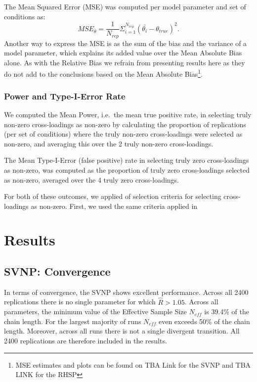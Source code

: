 \documentclass[
  man, donotrepeattitle,floatsintext]{apa6}
\begin{document}
The Mean Squared Error (MSE) was computed per model parameter and set of conditions as:
\[MSE_{\bar{\theta}} = \frac{1}{N_{rep}} \Sigma_{i = 1}^{N_{rep}} (\bar{\theta_i} - \theta_{true})^2.\]
Another way to express the MSE is as the sum of the bias and the variance of a model parameter, which explains its added value over the Mean Absolute Bias alone. As with the Relative Bias we refrain from presenting results here as they do not add to the conclusions based on the Mean Absolute Bias\footnote{MSE estimates and plots can be found on TBA Link for the SVNP and TBA LINK for the RHSP}.

\hypertarget{power-and-type-i-error-rate}{%
\subsubsection{Power and Type-I-Error Rate}\label{power-and-type-i-error-rate}}

We computed the Mean Power, i.e.~the mean true positive rate, in selecting truly non-zero cross-loadings as non-zero by calculating the proportion of replications (per set of conditions) where the truly non-zero cross-loadings were selected as non-zero, and averaging this over the 2 truly non-zero cross-loadings.

The Mean Type-I-Error (false positive) rate in selecting truly zero cross-loadings as non-zero, was computed as the proportion of truly zero cross-loadings selected as non-zero, averaged over the 4 truly zero cross-loadings.

For both of these outcomes, we applied of selection criteria for selecting cross-loadings as non-zero. First, we used the same criteria applied in

\hypertarget{results}{%
\section{Results}\label{results}}

\hypertarget{svnp-convergence}{%
\subsection{SVNP: Convergence}\label{svnp-convergence}}

In terms of convergence, the SVNP shows excellent performance. Across all 2400 replications there is no single parameter for which \(\hat{R} > 1.05\). Across all parameters, the minimum value of the Effective Sample Size \(N_{eff}\) is 39.4\% of the chain length. For the largest majority of runs \(N_{eff}\) even exceeds 50\% of the chain length. Moreover, across all runs there is not a single divergent transition. All 2400 replications are therefore included in the results.
\end{document}
